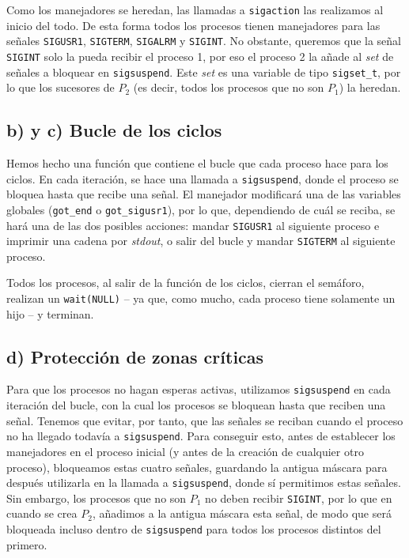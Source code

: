 \documentclass{article}
\begin{document}
Como los manejadores se heredan, las llamadas a \texttt{sigaction} las realizamos al inicio del todo. De esta forma todos los procesos tienen manejadores para las señales \texttt{SIGUSR1}, \texttt{SIGTERM}, \texttt{SIGALRM} y \texttt{SIGINT}. No obstante, queremos que la señal \texttt{SIGINT} solo la pueda recibir el proceso 1, por eso el proceso 2 la añade al \textit{set} de señales a bloquear en \texttt{sigsuspend}. Este \textit{set} es una variable de tipo \texttt{sigset\_t}, por lo que los sucesores de $P_2$ (es decir, todos los procesos que no son $P_1$) la heredan. 



\subsection*{b) y c) Bucle de los ciclos}

Hemos hecho una función que contiene el bucle que cada proceso hace para los ciclos. En cada iteración, se hace una llamada a \texttt{sigsuspend}, donde el proceso se bloquea hasta que recibe una señal. El manejador modificará una de las variables globales (\texttt{got\_end} o \texttt{got\_sigusr1}), por lo que, dependiendo de cuál se reciba, se hará una de las dos posibles acciones: mandar \texttt{SIGUSR1} al siguiente proceso e imprimir una cadena por \textit{stdout}, o salir del bucle y mandar \texttt{SIGTERM} al siguiente proceso.

Todos los procesos, al salir de la función de los ciclos, cierran el semáforo, realizan un \texttt{wait(NULL)} -- ya que, como mucho, cada proceso tiene solamente un hijo -- y terminan.

\subsection*{d) Protección de zonas críticas} 

Para que los procesos no hagan esperas activas, utilizamos \texttt{sigsuspend} en cada iteración del bucle, con la cual los procesos se bloquean hasta que reciben una señal. Tenemos que evitar, por tanto, que las señales se reciban cuando el proceso no ha llegado todavía a \texttt{sigsuspend}. Para conseguir esto, antes de establecer los manejadores en el proceso inicial (y antes de la creación de cualquier otro proceso), bloqueamos estas cuatro señales, guardando la antigua máscara para después utilizarla en la llamada a \texttt{sigsuspend}, donde sí permitimos estas señales. Sin embargo, los procesos que no son $P_1$ no deben recibir \texttt{SIGINT}, por lo que en cuando se crea $P_2$, añadimos a la antigua máscara esta señal, de modo que será bloqueada incluso dentro de \texttt{sigsuspend} para todos los procesos distintos del primero.
\end{document}
